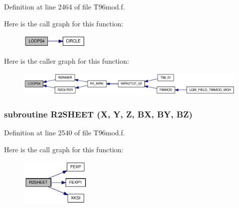 Definition at line 2464 of file T96mod.f.

Here is the call graph for this function:\nopagebreak
\begin{figure}[H]
\begin{center}
\leavevmode
\includegraphics[width=93pt]{_t96mod_8f_8bb46e1322b561a6e5aa91de2b85a0e2_cgraph}
\end{center}
\end{figure}


Here is the caller graph for this function:\nopagebreak
\begin{figure}[H]
\begin{center}
\leavevmode
\includegraphics[width=338pt]{_t96mod_8f_8bb46e1322b561a6e5aa91de2b85a0e2_icgraph}
\end{center}
\end{figure}
\hypertarget{_t96mod_8f_d2c23a8a964ae249deaa1665da76803f}{
\subsubsection[{R2SHEET}]{\setlength{\rightskip}{0pt plus 5cm}subroutine R2SHEET (X, \/  Y, \/  Z, \/  BX, \/  BY, \/  BZ)}}
\label{_t96mod_8f_d2c23a8a964ae249deaa1665da76803f}




Definition at line 2540 of file T96mod.f.

Here is the call graph for this function:\nopagebreak
\begin{figure}[H]
\begin{center}
\leavevmode
\includegraphics[width=95pt]{_t96mod_8f_d2c23a8a964ae249deaa1665da76803f_cgraph}
\end{center}
\end{figure}


